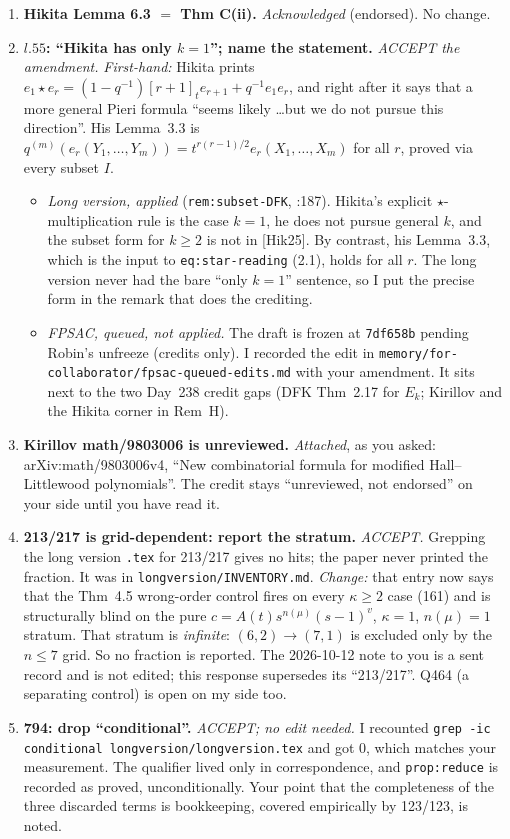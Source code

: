 \documentclass[11pt]{article}
\begin{document}
\begin{enumerate}[label=\textbf{F\arabic*.},leftmargin=2.2em]
\item \textbf{Hikita Lemma 6.3 $=$ Thm C(ii).} \emph{Acknowledged} (endorsed). No change.

\item \textbf{$l.55$: ``Hikita has only $k=1$''; name the statement.} \emph{ACCEPT the amendment.}
\emph{First-hand:} Hikita prints $e_1\star e_r=(1-q^{-1})[r+1]_te_{r+1}+q^{-1}e_1e_r$, and right after it says that a
more general Pieri formula ``seems likely \dots but we do not pursue this direction''. His Lemma~3.3 is
$q^{(m)}(e_r(Y_1,\dots,Y_m))=t^{r(r-1)/2}e_r(X_1,\dots,X_m)$ for all $r$, proved via every subset $I$.
\begin{itemize}
\item \emph{Long version, applied} (\texttt{rem:subset-DFK}, :187). Hikita's explicit $\star$-multiplication rule is the case $k=1$, he does not
pursue general $k$, and the subset form for $k\ge2$ is not in [Hik25]. By contrast, his Lemma~3.3, which is the input to
\texttt{eq:star-reading} (2.1), holds for all $r$. The long version never had the bare ``only $k=1$'' sentence, so I put the precise form in the
remark that does the crediting.
\item \emph{FPSAC, queued, not applied.} The draft is frozen at \texttt{7df658b} pending Robin's unfreeze (credits only). I recorded the edit
in \texttt{memory/for-collaborator/fpsac-queued-edits.md} with your amendment. It sits next to the two Day~238
credit gaps (DFK Thm~2.17 for $E_k$; Kirillov and the Hikita corner in Rem~H).
\end{itemize}

\item \textbf{Kirillov math/9803006 is unreviewed.} \emph{Attached}, as you asked: arXiv:math/9803006v4, ``New combinatorial formula
for modified Hall--Littlewood polynomials''. The credit stays ``unreviewed, not endorsed'' on your side until you have read it.

\item \textbf{213/217 is grid-dependent: report the stratum.} \emph{ACCEPT.} Grepping the long version \texttt{.tex}
for 213/217 gives no hits; the paper never printed the fraction. It was in \texttt{longversion/INVENTORY.md}. \emph{Change:} that
entry now says that the Thm~4.5 wrong-order control fires on every $\kappa\ge2$ case (161) and is structurally blind on the pure
$c=A(t)s^{n(\mu)}(s-1)^v$, $\kappa=1$, $n(\mu)=1$ stratum. That stratum is \emph{infinite}: $(6,2)\to(7,1)$ is excluded only by the
$n\le7$ grid. So no fraction is reported. The 2026-10-12 note to you is a sent record and is not edited; this
response supersedes its ``213/217''. Q464 (a separating control) is open on my side too.

\item \textbf{794: drop ``conditional''.} \emph{ACCEPT; no edit needed.} I recounted
\texttt{grep -ic conditional longversion/longversion.tex} and got $0$, which matches your measurement. The qualifier lived only in
correspondence, and \texttt{prop:reduce} is recorded as proved, unconditionally. Your point that the completeness of the
three discarded terms is bookkeeping, covered empirically by 123/123, is noted.
\end{enumerate}
\end{document}
